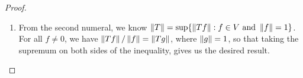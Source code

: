 \begin{proof}
\begin{enumerate}
    Take any $c \in B$, so that for any $f \in V$ with $f \neq 0$, $\norm{Tf} / \norm{f} \leq c$, restricting this to the vectors with $\norm{f} = 1$, we have $\norm{Tf} \leq c$.
    Now taking the supremum on the left hand side tells us that $\sup A \leq c$, so that $\sup A$ is a lower bound of $B$, meaning that $\sup A \leq \sup B$.
    
    \item From the second numeral, we know $\left\lVert T\right\rVert = \sup \{\left\lVert Tf\right\rVert: f \in V \text{ and } \left\lVert f\right\rVert = 1\}$.
    For all $f \neq 0 $, we have $\left\lVert Tf\right\rVert/\left\lVert f\right\rVert = \left\lVert Tg\right\rVert$, where $\left\lVert g\right\rVert = 1$, so that taking the supremum on both sides of the inequality, gives us the desired result.
\end{enumerate}
\end{proof} 

